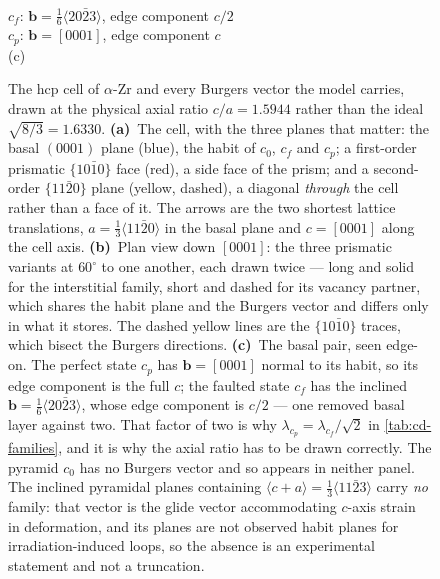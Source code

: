 \begin{figure}[htbp]
\begin{minipage}[b]{0.32\textwidth}
\\[2pt]
{\scriptsize
 \textcolor{famCf}{$c_f$}: $\bm b=\tfrac16\langle20\bar23\rangle$,
 edge component $c/2$\\[1pt]
 \textcolor{famCp}{$c_p$}: $\bm b=[0001]$, edge component $c$}\\[1pt]
{\small (c)}
\end{minipage}

\caption{The hcp cell of $\alpha$-Zr and every Burgers vector the model carries,
drawn at the physical axial ratio $c/a=1.5944$ rather than the ideal
$\sqrt{8/3}=1.6330$. \textbf{(a)}~The cell, with the three planes that matter:
the basal $(0001)$ plane (blue), the habit of $c_0$, $c_f$ and $c_p$; a
first-order prismatic $\{10\bar10\}$ face (red), a side face of the prism; and a
second-order $\{11\bar20\}$ plane (yellow, dashed), a diagonal \emph{through}
the cell rather than a face of it. The arrows are the two shortest lattice
translations, $a=\tfrac13\langle11\bar20\rangle$ in the basal plane and
$c=[0001]$ along the cell axis. \textbf{(b)}~Plan view down $[0001]$: the three
prismatic variants at $60^\circ$ to one another, each drawn twice --- long and
solid for the interstitial family, short and dashed for its vacancy partner,
which shares the habit plane and the Burgers vector and differs only in what it
stores. The dashed yellow lines are the $\{10\bar10\}$ traces, which bisect the
Burgers directions. \textbf{(c)}~The basal pair, seen edge-on. The perfect state
$c_p$ has $\bm b=[0001]$ normal to its habit, so its edge component is the full
$c$; the faulted state $c_f$ has the inclined
$\bm b=\tfrac16\langle20\bar23\rangle$, whose edge component is $c/2$ --- one
removed basal layer against two. That factor of two is why
$\lambda_{c_p}=\lambda_{c_f}/\sqrt2$ in \cref{tab:cd-families}, and it is why
the axial ratio has to be drawn correctly. The pyramid $c_0$ has no Burgers
vector and so appears in neither panel. The inclined pyramidal planes containing
$\langle c+a\rangle=\tfrac13\langle11\bar23\rangle$ carry \emph{no} family: that
vector is the glide vector accommodating $c$-axis strain in deformation, and its
planes are not observed habit planes for irradiation-induced loops, so the
absence is an experimental statement and not a truncation.}
\label{fig:hcp-cell}
\end{figure}
